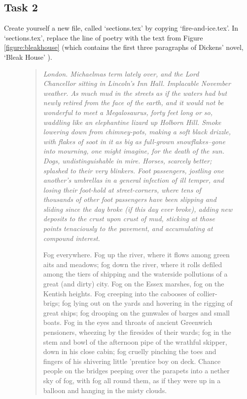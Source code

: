 \begin{refsection}
\subsection{Task 2}
\label{sec:task-2}

 Create yourself a new file, called `sections.tex' by copying `fire-and-ice.tex'. In `sections.tex', replace the line of poetry with the text from Figure \ref{figure:bleakhouse} (which contains the first three paragraphs of Dickens' novel, `Bleak House' \citep{dickens1852}).

\begin{figure}[tbp]

\begin{quote}

\itshape
London. Michaelmas term lately over, and the Lord Chancellor sitting
in Lincoln's Inn Hall. Implacable November weather. As much mud in
the streets as if the waters had but newly retired from the face of
the earth, and it would not be wonderful to meet a Megalosaurus,
forty feet long or so, waddling like an elephantine lizard up Holborn
Hill. Smoke lowering down from chimney-pots, making a soft black
drizzle, with flakes of soot in it as big as full-grown
snowflakes--gone into mourning, one might imagine, for the death of
the sun. Dogs, undistinguishable in mire. Horses, scarcely better;
splashed to their very blinkers. Foot passengers, jostling one
another's umbrellas in a general infection of ill temper, and losing
their foot-hold at street-corners, where tens of thousands of other
foot passengers have been slipping and sliding since the day broke
(if this day ever broke), adding new deposits to the crust upon crust
of mud, sticking at those points tenaciously to the pavement, and
accumulating at compound interest.



Fog everywhere. Fog up the river, where it flows among green aits and
meadows; fog down the river, where it rolls defiled among the tiers
of shipping and the waterside pollutions of a great (and dirty) city.
Fog on the Essex marshes, fog on the Kentish heights. Fog creeping
into the cabooses of collier-brigs; fog lying out on the yards and
hovering in the rigging of great ships; fog drooping on the gunwales
of barges and small boats. Fog in the eyes and throats of ancient
Greenwich pensioners, wheezing by the firesides of their wards; fog
in the stem and bowl of the afternoon pipe of the wrathful skipper,
down in his close cabin; fog cruelly pinching the toes and fingers of
his shivering little 'prentice boy on deck. Chance people on the
bridges peeping over the parapets into a nether sky of fog, with fog
all round them, as if they were up in a balloon and hanging in the
misty clouds.


\end{quote}
\end{figure}
\end{refsection}
